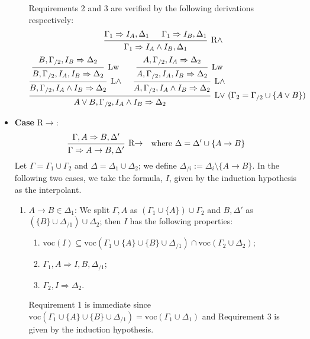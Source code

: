 \documentclass[a4paper]{article}
\newcommand{\voc}{\mathrm{voc}}
\begin{document}
\begin{itemize}
\begin{enumerate}
    Requirements 2 and 3 are verified by the following derivations respectively:
    \[
      \begin{prooftree}
        \hypo{\Gamma_1 \Rightarrow I_A,\Delta_1}
        \hypo{\Gamma_1 \Rightarrow I_B,\Delta_1}
        \infer2[R$\wedge$]{\Gamma_1 \Rightarrow I_A \wedge I_B, \Delta_1}
      \end{prooftree}
    \]
    \[
      \begin{prooftree}
        \hypo{B, \Gamma_{/2}, I_B \Rightarrow \Delta_2}
        \infer1[Lw]{B, \Gamma_{/2}, I_A, I_B \Rightarrow \Delta_2}
        \infer1[L$\wedge$]{B, \Gamma_{/2}, I_A \wedge I_B \Rightarrow \Delta_2}
        \hypo{A, \Gamma_{/2}, I_A \Rightarrow \Delta_2}
        \infer1[Lw]{A, \Gamma_{/2}, I_A, I_B \Rightarrow \Delta_2}
        \infer1[L$\wedge$]{A, \Gamma_{/2}, I_A \wedge I_B \Rightarrow \Delta_2}
        \infer2[L$\vee$ ($\Gamma_2 = \Gamma_{/2} \cup \{A \vee B\}$)]{A \vee B, \Gamma_{/2}, I_A \wedge I_B \Rightarrow \Delta_2}
      \end{prooftree}
    \]
  \end{enumerate}
\item \textbf{Case} R$\to$:
  \begin{align*}
    \begin{prooftree}
      \hypo{\Gamma, A \Rightarrow B, \Delta'}
      \infer1[R$\to$]{\Gamma \Rightarrow A \to B, \Delta'}
    \end{prooftree}
    && \text{where $\Delta = \Delta' \cup \{A \to B\}$}
  \end{align*}
  Let $\Gamma = \Gamma_1 \cup \Gamma_2$ and $\Delta = \Delta_1 \cup \Delta_2$; we define $\Delta_{/i} := \Delta_i \setminus \{A \to B\}$.
  In the following two cases, we take the formula, $I$, given by the induction hypothesis as the interpolant.
  \begin{enumerate}
  \item $A \to B \in \Delta_1$: We split $\Gamma,A$ as $(\Gamma_1 \cup \{A\}) \cup \Gamma_2$ and $B,\Delta'$ as $(\{B\} \cup \Delta_{/1}) \cup \Delta_2$; then $I$ has the following properties:
    \begin{enumerate}
    \item $\voc(I) \subseteq \voc(\Gamma_1 \cup \{A\} \cup \{B\} \cup \Delta_{/1}) \cap \voc(\Gamma_2 \cup \Delta_2)$;
    \item $\Gamma_1,A \Rightarrow I, B, \Delta_{/1}$;
    \item $\Gamma_2,I \Rightarrow \Delta_2$.
    \end{enumerate}
    Requirement 1 is immediate since $\voc(\Gamma_1 \cup \{A\} \cup \{B\} \cup \Delta_{/1}) = \voc(\Gamma_1 \cup \Delta_1)$ and Requirement 3 is given by the induction hypothesis.


\end{enumerate}
\end{itemize}
\end{document}
